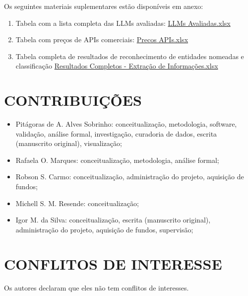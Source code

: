 \documentclass{IEEEphot}
\begin{document}
Os seguintes materiais suplementares estão disponíveis em anexo:

\begin{enumerate}
    \item Tabela com a lista completa das LLMs avaliadas: \href{https://docs.google.com/spreadsheets/d/1UOkDTzDxY3d-jqjCfmKdDqE0pEKLQ6xktkMWq778H-I/edit?usp=sharing}{LLMs Avaliadas.xlsx} \label{apx:model_list}
    \item Tabela com preços de APIs comerciais: \href{https://docs.google.com/spreadsheets/d/1KAiIcz5XdF48qHfLTqmgpDR6q8Pshca5mSIR-16KUWA/edit?usp=sharing}{Precos APIs.xlsx} \label{apx:api_prices}
    \item Tabela completa de resultados de reconhecimento de entidades nomeadas e classificação \href{https://docs.google.com/spreadsheets/d/1mpz3oGaerNNI0qwNpJYvi-3lv4r3vAlylgZwpDGCaM0/edit?usp=sharing}{Resultados Completos - Extração de Informações.xlsx} \label{apx:info_extract_results}
\end{enumerate}

\section*{CONTRIBUIÇÕES}

\begin{itemize}
    \item Pitágoras de A. Alves Sobrinho: conceitualização, metodologia, software, validação, análise formal, investigação, curadoria de dados, escrita (manuscrito original), visualização;
    \item Rafaela O. Marques: conceitualização, metodologia, análise formal;
    \item Robson S. Carmo: conceitualização, administração do projeto, aquisição de fundos;
    \item Michell S. M. Resende: conceitualização;
    \item Igor M. da Silva: conceitualização, escrita (manuscrito original), administração do projeto, aquisição de fundos, supervisão;
\end{itemize}



\section*{CONFLITOS DE INTERESSE}
Os autores declaram que eles não tem conflitos de interesses.
\end{document}
